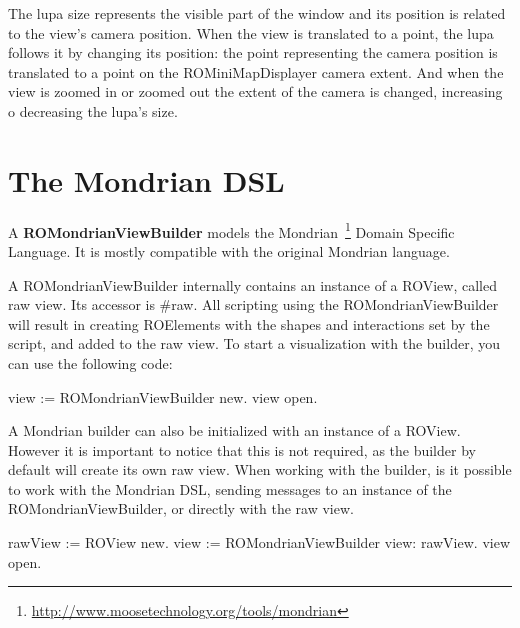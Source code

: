 \documentclass[a4paper,10pt,twoside]{book}
\begin{document}
The lupa  size represents the visible part of the window and its position is related to the view's camera position. When the view is translated to a point, the lupa follows it by changing its position: the point representing the camera position is translated to a point on the ROMiniMapDisplayer camera extent. And when the view is zoomed in or zoomed out the extent of the camera is changed, increasing o decreasing the lupa's size.





\section{The Mondrian DSL}

A \textbf{ROMondrianViewBuilder} models the Mondrian~\footnote{\url{http://www.moosetechnology.org/tools/mondrian}} Domain Specific Language. It is mostly compatible with the original Mondrian language.%

A ROMondrianViewBuilder internally contains an instance of a ROView, called raw view. Its accessor is \#raw. All scripting  using the ROMondrianViewBuilder will result in creating ROElements with the shapes and interactions set by the script, and added to the raw view. To start a visualization with the builder, you can use the following code:

\begin{code}{}
view := ROMondrianViewBuilder new.
view open.
\end{code}

A Mondrian builder can also be initialized with an instance of a ROView. However it is important to notice that this is not required, as the builder by default will create its own raw view.
When working with the builder, is it possible to work with the Mondrian DSL, sending messages to an instance of the ROMondrianViewBuilder, or directly with the raw view. %

\begin{code}{}
rawView := ROView new.
view := ROMondrianViewBuilder view: rawView.
view open.
\end{code}
\end{document}
